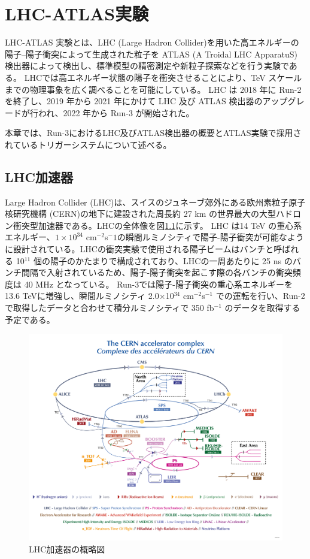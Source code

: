 \chapter{LHC-ATLAS実験}
\label{chapter2}

LHC-ATLAS 実験とは、LHC (Large Hadron Collider)を用いた高エネルギーの陽子–陽子衝突によって生成された粒子を ATLAS (A Troidal LHC ApparatuS) 検出器によって検出し、標準模型の精密測定や新粒子探索などを行う実験である。
LHCでは高エネルギー状態の陽子を衝突させることにより、TeV スケールまでの物理事象を広く調べることを可能にしている。
LHC は 2018 年に Run-2 を終了し、2019 年から 2021 年にかけて LHC 及び ATLAS 検出器のアップグレードが行われ、2022 年から Run-3 が開始された。

本章では、Run-3におけるLHC及びATLAS検出器の概要とATLAS実験で採用されているトリガーシステムについて述べる。

\section{LHC加速器}
\label{section2-1}
Large Hadron Collider (LHC)は、スイスのジュネーブ郊外にある欧州素粒子原子核研究機構 (CERN)の地下に建設された周長約 27 km の世界最大の大型ハドロン衝突型加速器である。LHCの全体像を図\ref{fig:LHC加速器}に示す。
LHC は14 TeV の重心系エネルギー、$1\times10^{34}$ cm$^{-2}$s${^-1}$の瞬間ルミノシティで陽子-陽子衝突が可能なように設計されている。LHCの衝突実験で使用される陽子ビームはバンチと呼ばれる 10${^11}$ 個の陽子のかたまりで構成されており、LHCの一周あたりに 25 ns のバンチ間隔で入射されているため、陽子-陽子衝突を起こす際の各バンチの衝突頻度は 40 MHz となっている。
Run-3では陽子-陽子衝突の重心系エネルギーを 13.6 TeVに増強し、瞬間ルミノシティ 2.0$\times$10$^{34}$ cm$^{−2}$s$^{−1}$ での運転を行い、Run-2 で取得したデータと合わせて積分ルミノシティで 350 fb$^{−1}$ のデータを取得する予定である。

\begin{figure}[tb]
  \centering
  \includegraphics[clip]{fig/2/accel_complex-v2022_complex.png}
  \caption{LHC加速器の概略図}
  \label{fig:LHC加速器}
\end{figure}


